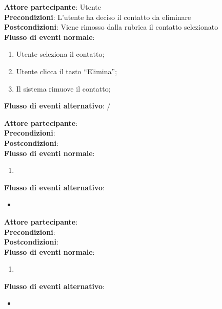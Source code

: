 \begin{tcolorbox}[colback=white,colframe=black!80!white,title=\textbf{C1 - Rimuovere contatto}]
	\textbf{Attore partecipante}: Utente
	\\\textbf{Precondizioni}: L’utente ha deciso il contatto da eliminare
	\\\textbf{Postcondizioni}: Viene rimosso dalla rubrica il contatto selezionato
	\\\textbf{Flusso di eventi normale}:
	\begin{enumerate}[noitemsep, topsep=0pt]
		\item Utente seleziona il contatto;
		\item Utente clicca il tasto “Elimina”;
		\item Il sistema rimuove il contatto;		
	\end{enumerate}
	\textbf{Flusso di eventi alternativo}: /
\end{tcolorbox}

\begin{tcolorbox}[colback=white,colframe=black!80!white,title=\textbf{C2}]
	\textbf{Attore partecipante}:
	\\\textbf{Precondizioni}: 
	\\\textbf{Postcondizioni}:
	\\\textbf{Flusso di eventi normale}:
	\begin{enumerate}[noitemsep, topsep=0pt]
		\item 
	\end{enumerate}
	\textbf{Flusso di eventi alternativo}:
	\begin{itemize}[noitemsep, topsep=0pt]
		\item[]
	\end{itemize}
\end{tcolorbox}

\begin{tcolorbox}[colback=white,colframe=black!80!white,title=\textbf{C3}]
	\textbf{Attore partecipante}:
	\\\textbf{Precondizioni}: 
	\\\textbf{Postcondizioni}:
	\\\textbf{Flusso di eventi normale}:
	\begin{enumerate}[noitemsep, topsep=0pt]
		\item 
	\end{enumerate}
	\textbf{Flusso di eventi alternativo}:
	\begin{itemize}[noitemsep, topsep=0pt]
		\item[]
	\end{itemize}
\end{tcolorbox}